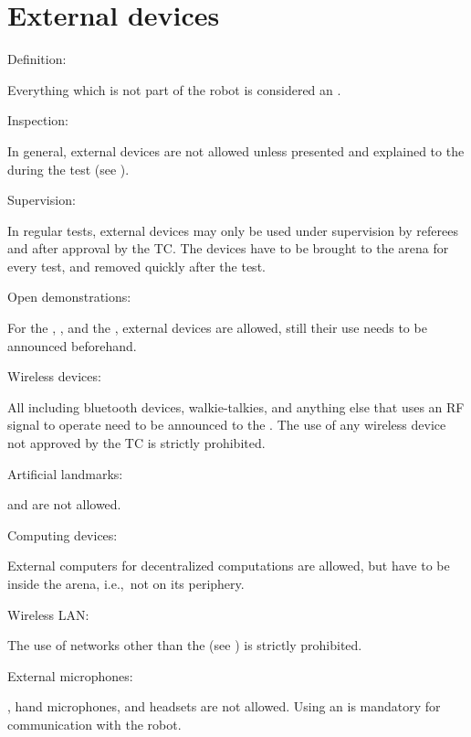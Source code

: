\section{External devices}\label{rule:roobt_external_devices}
\begin{enumerate}
	{\bf\item Definition:} Everything which is not part of the robot is considered an . 
	{\bf\item Inspection:} In general, external devices are not allowed unless presented and explained to the  during the  test (see ).
	{\bf\item Supervision:} In regular tests, external devices may only be used under supervision by referees and after approval by the TC. The devices have to be brought to the arena for every test, and removed quickly after the test.
	{\bf\item Open demonstrations:} For the , , and the , external devices are allowed, still their use needs to be announced beforehand.
	{\bf\item Wireless devices:} All  including bluetooth devices, walkie-talkies, and anything else that uses an RF signal to operate need to be announced to the . The use of any wireless device not approved by the TC is strictly prohibited.  
	{\bf\item Artificial landmarks:}  and  are not allowed.
	{\bf\item Computing devices:} External computers for decentralized computations are allowed, but have to be inside the arena, i.e.,~not on its periphery.
	{\bf\item Wireless LAN:} The use of networks other than the  (see ) is strictly prohibited.
	{\bf\item External microphones: }, hand microphones, and headsets are not allowed. Using an  is mandatory for communication with the robot.
\end{enumerate}


